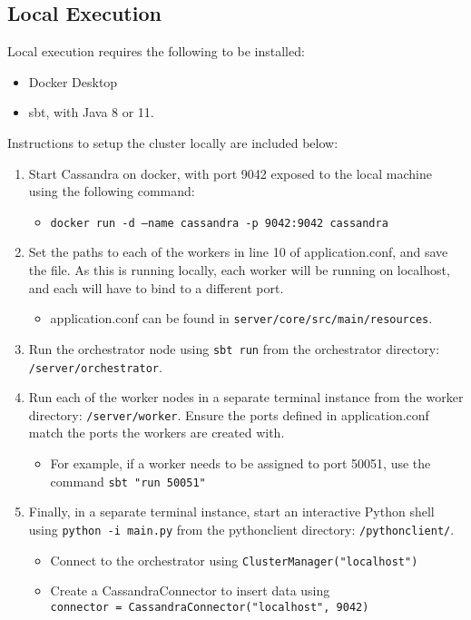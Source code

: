 \subsection{Local Execution}
Local execution requires the following to be installed:
\begin{itemize}
	\item Docker Desktop
	\item sbt, with Java 8 or 11.
\end{itemize}


Instructions to setup the cluster locally are included below:

\begin{enumerate}
	\item Start Cassandra on docker, with port 9042 exposed to the local machine using the following command:
	\begin{itemize}
		\item \texttt{docker run -d --name cassandra -p 9042:9042 cassandra}
	\end{itemize}
	\item Set the paths to each of the workers in line 10 of application.conf, and save the file. As this is running locally, each worker will be running on localhost, and each will have to bind to a different port.
	\begin{itemize}
		\item application.conf can be found in \texttt{server/core/src/main/resources}.
	\end{itemize}
	\item Run the orchestrator node using \texttt{sbt run} from the orchestrator directory: \texttt{/server/orchestrator}.
	\item Run each of the worker nodes in a separate terminal instance from the worker directory: \texttt{/server/worker}. Ensure the ports defined in application.conf match the ports the workers are created with.
	\begin{itemize}
		\item For example, if a worker needs to be assigned to port 50051, use the command \texttt{sbt "run 50051"}
	\end{itemize}
	\item Finally, in a separate terminal instance, start an interactive Python shell using \texttt{python -i main.py} from the python\textunderscore client directory: \texttt{/python\textunderscore client/}.
	\begin{itemize}
		\item Connect to the orchestrator using \texttt{ClusterManager("localhost")}
		\item Create a CassandraConnector to insert data using \\ \texttt{connector = CassandraConnector("localhost", 9042)}
	\end{itemize}
\end{enumerate}